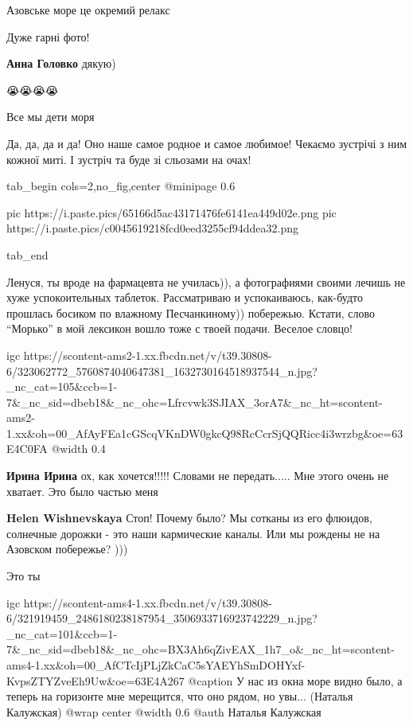 
Азовське море це окремий релакс 💙💛


Дуже гарні фото!

\textbf{Анна Головко} дякую)

😭😭😭😭


Все мы дети моря


Да, да, да и да! Оно наше самое родное и самое любимое! Чекаємо зустрічі з ним
кожної миті. І зустріч та буде зі сльозами на очах!



\ifcmt
  tab_begin cols=2,no_fig,center
     @minipage 0.6

     pic https://i.paste.pics/65166d5ac43171476fe6141ea449d02e.png
     pic https://i.paste.pics/c0045619218fcd0eed3255cf94ddea32.png

  tab_end
\fi


Ленуся, ты вроде на фармацевта не училась)), а фотографиями своими лечишь не
хуже успокоительных таблеток. Рассматриваю и успокаиваюсь, как-будто прошлась
босиком по влажному Песчанкиному)) побережью. Кстати, слово \enquote{Морько} в мой
лексикон вошло тоже с твоей подачи. Веселое словцо!


\ifcmt
  igc https://scontent-ams2-1.xx.fbcdn.net/v/t39.30808-6/323062772_5760874040647381_1632730164518937544_n.jpg?_nc_cat=105&ccb=1-7&_nc_sid=dbeb18&_nc_ohc=Lfrcvwk3SJIAX_3orA7&_nc_ht=scontent-ams2-1.xx&oh=00_AfAyFEa1cGScqVKnDW0gkcQ98RcCcrSjQQRicc4i3wrzbg&oe=63E4C0FA
  @width 0.4
\fi

\begin{itemize} %
\textbf{Ирина Ирина} ох, как хочется!!!!! Словами не передать..... Мне этого очень не хватает. Это было частью меня

\textbf{Helen Wishnevskaya} Стоп! Почему было? Мы сотканы из его флюидов, солнечные дорожки - это наши кармические каналы. Или мы рождены не на Азовском побережье? )))
\end{itemize} %


Это ты


\ifcmt
  igc https://scontent-ams4-1.xx.fbcdn.net/v/t39.30808-6/321919459_2486180238187954_3506933716923742229_n.jpg?_nc_cat=101&ccb=1-7&_nc_sid=dbeb18&_nc_ohc=BX3Ah6qZivEAX_1h7_o&_nc_ht=scontent-ams4-1.xx&oh=00_AfCTcIjPLjZkCaC5sYAEYhSmDOHYxf-KvpsZTYZveEh9Uw&oe=63E4A267
  @caption У нас из окна море видно было, а теперь на горизонте мне мерещится, что оно рядом, но увы... (Наталья Калужская)
  @wrap center
  @width 0.6
  @auth Наталья Калужская
\fi


